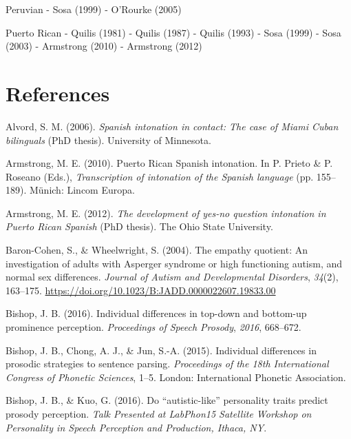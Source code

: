 \documentclass[]{article}
\newlength{\cslhangindent}
\newenvironment{CSLReferences}[2] %
 {%
  \setlength{\parindent}{0pt}
  \ifodd #1 \everypar{\setlength{\hangindent}{\cslhangindent}}\ignorespaces\fi
  \ifnum #2 > 0
  \setlength{\parskip}{#2\baselineskip}
  \fi
 }%
 {}
\begin{document}
Peruvian
- Sosa (1999)
- O'Rourke (2005)

Puerto Rican
- Quilis (1981)
- Quilis (1987)
- Quilis (1993)
- Sosa (1999)
- Sosa (2003)
- Armstrong (2010)
- Armstrong (2012)

\newpage

\hypertarget{references}{%
\section{References}\label{references}}

\hypertarget{refs}{}
\begin{CSLReferences}{1}{0}
\leavevmode{}%
Alvord, S. M. (2006). \emph{Spanish intonation in contact: The case of {M}iami {C}uban bilinguals} (PhD thesis). University of Minnesota.

\leavevmode{}%
Armstrong, M. E. (2010). Puerto {R}ican {S}panish intonation. In P. Prieto \& P. Roseano (Eds.), \emph{Transcription of intonation of the {S}panish language} (pp. 155--189). Münich: Lincom Europa.

\leavevmode{}%
Armstrong, M. E. (2012). \emph{The development of yes-no question intonation in {P}uerto {R}ican {S}panish} (PhD thesis). The Ohio State University.

\leavevmode{}%
Baron-Cohen, S., \& Wheelwright, S. (2004). The empathy quotient: An investigation of adults with {A}sperger syndrome or high functioning autism, and normal sex differences. \emph{Journal of Autism and Developmental Disorders}, \emph{34}(2), 163--175. \url{https://doi.org/10.1023/B:JADD.0000022607.19833.00}

\leavevmode{}%
Bishop, J. B. (2016). Individual differences in top-down and bottom-up prominence perception. \emph{Proceedings of Speech Prosody}, \emph{2016}, 668--672.

\leavevmode{}%
Bishop, J. B., Chong, A. J., \& Jun, S.-A. (2015). Individual differences in prosodic strategies to sentence parsing. \emph{Proceedings of the 18th International Congress of Phonetic Sciences}, 1--5. London: International Phonetic Association.

\leavevmode{}%
Bishop, J. B., \& Kuo, G. (2016). Do {``autistic-like''} personality traits predict prosody perception. \emph{Talk Presented at LabPhon15 Satellite Workshop on Personality in Speech Perception and Production, Ithaca, NY}.


\end{CSLReferences}
\end{document}
